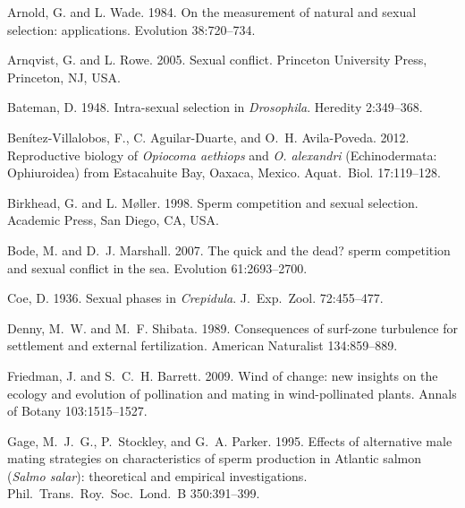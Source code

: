 \documentclass{article}
\begin{document}
\begin{thebibliography}{}

Arnold, G. and L. Wade. 1984.
\newblock On the measurement of natural and sexual selection: applications.
\newblock Evolution 38:720--734.

Arnqvist, G. and L. Rowe. 2005.
\newblock Sexual conflict.
\newblock Princeton University Press, Princeton, NJ, USA.

Bateman, D. 1948.
\newblock Intra-sexual selection in \textit{Drosophila}.
\newblock Heredity 2:349--368.

Ben\'{i}tez-Villalobos, F., C. Aguilar-Duarte, and O.~H. Avila-Poveda. 2012.
\newblock Reproductive biology of \textit{Opiocoma aethiops} and \textit{O. alexandri} (Echinodermata: Ophiuroidea) from Estacahuite Bay, Oaxaca, Mexico.
\newblock Aquat.~Biol. 17:119--128.

Birkhead, G. and L. M{\o}ller. 1998.
\newblock Sperm competition and sexual selection.
\newblock Academic Press, San Diego, CA, USA.

Bode, M. and D.~J. Marshall. 2007.
\newblock The quick and the dead? sperm competition and sexual conflict in the sea.
\newblock Evolution 61:2693--2700.

Coe, D. 1936.
\newblock Sexual phases in \textit{Crepidula}.
\newblock J.~Exp.~Zool. 72:455--477.

Denny, M.~W. and M.~F. Shibata. 1989.
\newblock Consequences of surf-zone turbulence for settlement and external fertilization.
\newblock American Naturalist 134:859--889.

Friedman, J. and  S.~C.~H. Barrett. 2009.
\newblock Wind of change: new insights on the ecology and evolution of pollination and mating in wind-pollinated plants.
\newblock Annals of Botany 103:1515--1527.

Gage, M.~J.~G., P.~Stockley, and G.~A. Parker. 1995.
\newblock Effects of alternative male mating strategies on characteristics of sperm production in Atlantic salmon (\textit{Salmo salar}): theoretical and empirical investigations.
\newblock Phil.~Trans.~Roy.~Soc.~Lond.~B 350:391--399.


\end{thebibliography}
\end{document}
